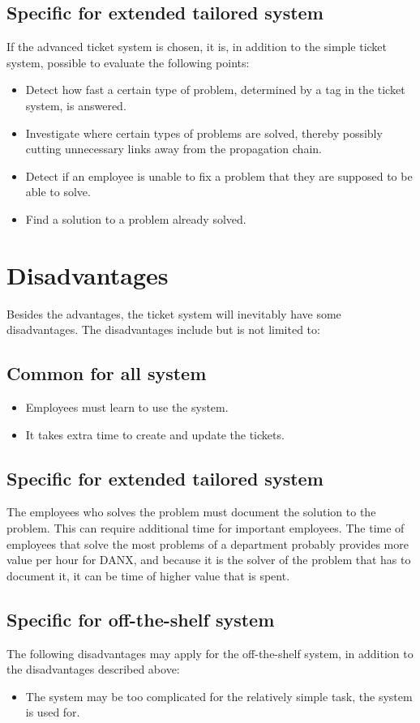 \subsection{Specific for extended tailored system}
If the advanced ticket system is chosen, it is, in addition to the simple ticket system, possible to evaluate the following points:
\begin{itemize}
	\item Detect how fast a certain type of problem, determined by a tag in the ticket system, is answered.
\item Investigate where certain types of problems are solved, thereby possibly cutting unnecessary links away from the propagation chain.
\item Detect if an employee is unable to fix a problem that they are supposed to be able to solve.
\item Find a solution to a problem already solved.
\end{itemize}

\section{Disadvantages}
Besides the advantages, the ticket system will inevitably have some disadvantages. The disadvantages include but is not limited to:

\subsection{Common for all system}
\begin{itemize}
	\item Employees must learn to use the system.
	\item It takes extra time to create and update the tickets.
\end{itemize}

\subsection{Specific for extended tailored system}
The employees who solves the problem must document the solution to the problem. This can require additional time for important employees. The time of employees that solve the most problems of a department probably provides more value per hour for DANX, and because it is the solver of the problem that has to document it, it can be time of higher value that is spent.

\subsection{Specific for off-the-shelf system}
The following disadvantages may apply for the off-the-shelf system, in addition to the disadvantages described above:
\begin{itemize}
	\item The system may be too complicated for the relatively simple task, the system is used for.
\end{itemize}



